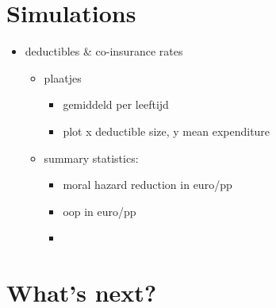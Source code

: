 \documentclass[11pt]{article}
\begin{document}
\section{Simulations}
\label{sec:org8e4f0b4}

\begin{itemize}
\item deductibles \& co-insurance rates
\begin{itemize}
\item plaatjes
\begin{itemize}
\item gemiddeld per leeftijd
\item plot x deductible size, y mean expenditure
\end{itemize}
\item summary statistics:
\begin{itemize}
\item moral hazard reduction in euro/pp
\item oop in euro/pp
\item 
\end{itemize}
\end{itemize}
\end{itemize}

\section{What's next?}
\label{sec:orgee9308b}
\end{document}
